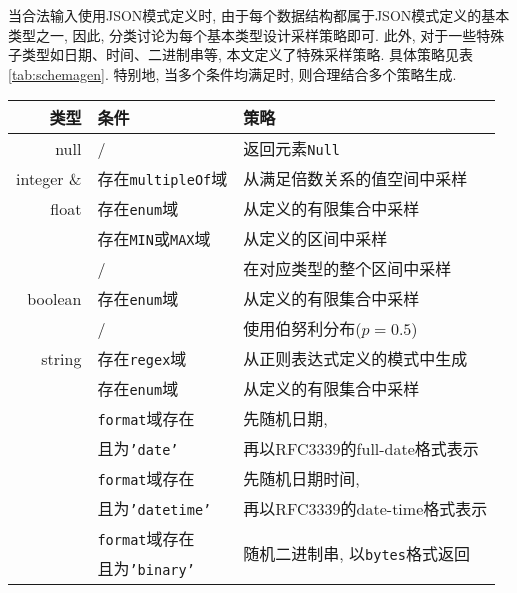             当合法输入使用JSON模式定义时, 由于每个数据结构都属于JSON模式定义的基本类型之一, 因此, 分类讨论为每个基本类型设计采样策略即可. 此外, 对于一些特殊子类型如日期、时间、二进制串等, 本文定义了特殊采样策略. 具体策略见表\ref{tab:schemagen}. 特别地, 当多个条件均满足时, 则合理结合多个策略生成.
            
            \begin{table}[!htb]
                \centering
                \begin{tabular}{rll}
                    \toprule
                    类型 & 条件 & 策略 \\
                    \midrule
                    null & / & 返回元素\texttt{Null} \\
                    \hline
                    integer \& & 存在\texttt{multipleOf}域 & 从满足倍数关系的值空间中采样 \\
                    \cline{2-3}
                    float & 存在\texttt{enum}域 & 从定义的有限集合中采样 \\
                    \cline{2-3}
                    & 存在\texttt{MIN}或\texttt{MAX}域 & 从定义的区间中采样 \\
                    \cline{2-3}
                    & / & 在对应类型的整个区间中采样 \\
                    \hline
                    boolean & 存在\texttt{enum}域 & 从定义的有限集合中采样 \\
                    \cline{2-3}
                    & / & 使用伯努利分布($p=0.5$) \\
                    \hline
                    string & 存在\texttt{regex}域 & 从正则表达式定义的模式中生成 \\
                    \cline{2-3}
                    & 存在\texttt{enum}域 & 从定义的有限集合中采样 \\
                    \cline{2-3}
                    & \texttt{format}域存在 & 先随机日期, \\
                    & 且为\texttt{'date'} & 再以RFC3339的full-date格式表示 \\
                    \cline{2-3}
                    & \texttt{format}域存在 & 先随机日期时间, \\
                    & 且为\texttt{'datetime'} & 再以RFC3339的date-time格式表示 \\
                    \cline{2-3}
                    & \texttt{format}域存在 & \multirow{2}{*}{随机二进制串, 以\texttt{bytes}格式返回} \\
                    & 且为\texttt{'binary'} &  \\

\end{tabular}
\end{table}
